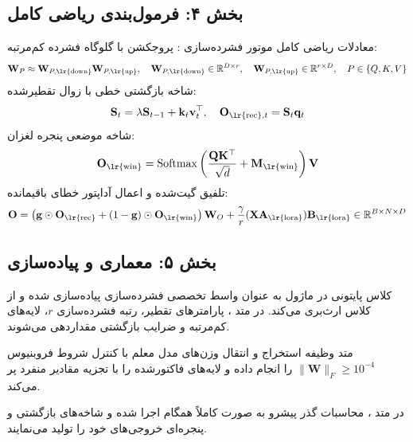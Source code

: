 \subsection*{بخش ۴: فرمول‌بندی ریاضی کامل }
معادلات ریاضی کامل موتور فشرده‌سازی :
پروجکشن با گلوگاه فشرده کم‌مرتبه:
\begin{equation}
\mathbf{W}_P \approx \mathbf{W}_{P, \text{\lr{down}}} \mathbf{W}_{P, \text{\lr{up}}}, \quad \mathbf{W}_{P, \text{\lr{down}}} \in \mathbb{R}^{D \times r}, \quad \mathbf{W}_{P, \text{\lr{up}}} \in \mathbb{R}^{r \times D}, \quad P \in \{Q, K, V\}
\end{equation}
شاخه بازگشتی خطی با زوال تقطیرشده:
\begin{equation}
\mathbf{S}_t = \lambda \mathbf{S}_{t-1} + \mathbf{k}_t \mathbf{v}_t^\top, \quad \mathbf{O}_{\text{\lr{rec}}, t} = \mathbf{S}_t \mathbf{q}_t
\end{equation}
شاخه موضعی پنجره لغزان:
\begin{equation}
\mathbf{O}_{\text{\lr{win}}} = \operatorname{Softmax}\left(\frac{\mathbf{Q}\mathbf{K}^\top}{\sqrt{d}} + \mathbf{M}_{\text{\lr{win}}}\right)\mathbf{V}
\end{equation}
تلفیق گیت‌شده و اعمال آداپتور خطای باقیمانده:
\begin{equation}
\mathbf{O} = \left(\mathbf{g} \odot \mathbf{O}_{\text{\lr{rec}}} + (1 - \mathbf{g}) \odot \mathbf{O}_{\text{\lr{win}}}\right)\mathbf{W}_O + \frac{\gamma}{r}(\mathbf{X}\mathbf{A}_{\text{\lr{lora}}})\mathbf{B}_{\text{\lr{lora}}} \in \mathbb{R}^{B \times N \times D}
\end{equation}

\subsection*{بخش ۵: معماری و پیاده‌سازی }
کلاس پایتونی  در ماژول  به عنوان واسط تخصصی فشرده‌سازی پیاده‌سازی شده و از کلاس  ارث‌بری می‌کند. در متد ، پارامترهای تقطیر، رتبه فشرده‌سازی $r$، لایه‌های کم‌مرتبه و ضرایب بازگشتی مقداردهی می‌شوند.

متد  وظیفه استخراج و انتقال وزن‌های مدل معلم با کنترل شروط فروبنیوس $\|\mathbf{W}\|_F \ge 10^{-4}$ را انجام داده و لایه‌های فاکتورشده را با تجزیه مقادیر منفرد پر می‌کند.

در متد ، محاسبات گذر پیشرو به صورت کاملاً همگام اجرا شده و شاخه‌های بازگشتی و پنجره‌ای خروجی‌های خود را تولید می‌نمایند.

